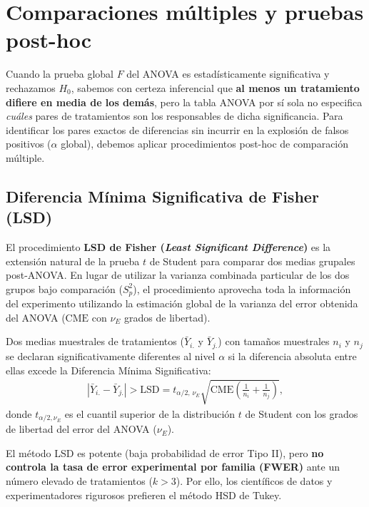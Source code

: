 \section*{Comparaciones múltiples y pruebas post-hoc}

Cuando la prueba global $F$ del ANOVA es estadísticamente significativa y rechazamos $H_0$, sabemos con certeza inferencial que \textbf{al menos un tratamiento difiere en media de los demás}, pero la tabla ANOVA por sí sola no especifica \emph{cuáles} pares de tratamientos son los responsables de dicha significancia. Para identificar los pares exactos de diferencias sin incurrir en la explosión de falsos positivos ($\alpha$ global), debemos aplicar procedimientos post-hoc de comparación múltiple.

\subsection*{Diferencia Mínima Significativa de Fisher (LSD)}

El procedimiento \textbf{LSD de Fisher (\emph{Least Significant Difference})} es la extensión natural de la prueba $t$ de Student para comparar dos medias grupales post-ANOVA. En lugar de utilizar la varianza combinada particular de los dos grupos bajo comparación ($S_p^2$), el procedimiento aprovecha toda la información del experimento utilizando la estimación global de la varianza del error obtenida del ANOVA ($\text{CME}$ con $\nu_E$ grados de libertad).

\begin{teorema}
	Dos medias muestrales de tratamientos ($\bar{Y}_{i.}$ y $\bar{Y}_{j.}$) con tamaños muestrales $n_i$ y $n_j$ se declaran significativamente diferentes al nivel $\alpha$ si la diferencia absoluta entre ellas excede la Diferencia Mínima Significativa:
	\begin{align}
		|\bar{Y}_{i.} - \bar{Y}_{j.}| > \text{LSD} = t_{\alpha/2, \, \nu_E} \sqrt{\text{CME} \left( \frac{1}{n_i} + \frac{1}{n_j} \right)},
	\end{align}
	donde $t_{\alpha/2, \nu_E}$ es el cuantil superior de la distribución $t$ de Student con los grados de libertad del error del ANOVA ($\nu_E$).
\end{teorema}

\begin{observacion}
	El método LSD es potente (baja probabilidad de error Tipo II), pero \textbf{no controla la tasa de error experimental por familia (FWER)} ante un número elevado de tratamientos ($k > 3$). Por ello, los científicos de datos y experimentadores rigurosos prefieren el método HSD de Tukey.
\end{observacion}

